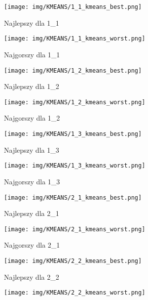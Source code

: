 \documentclass[12pt]{article}
\begin{document}
\begin{figure}[H]
    \centering
    \begin{subfigure}[b]{0.24\textwidth}
        \texttt{[image: img/KMEANS/1\_1\_kmeans\_best.png]}
        \caption{Najlepszy dla 1\_1}
    \end{subfigure}
    \hfill
    \begin{subfigure}[b]{0.24\textwidth}
        \texttt{[image: img/KMEANS/1\_1\_kmeans\_worst.png]}
        \caption{Najgorszy dla 1\_1}
    \end{subfigure}
    \hfill
    \begin{subfigure}[b]{0.24\textwidth}
        \texttt{[image: img/KMEANS/1\_2\_kmeans\_best.png]}
        \caption{Najlepszy dla 1\_2}
    \end{subfigure}
    \hfill
    \begin{subfigure}[b]{0.24\textwidth}
        \texttt{[image: img/KMEANS/1\_2\_kmeans\_worst.png]}
        \caption{Najgorszy dla 1\_2}
    \end{subfigure}
    \begin{subfigure}[b]{0.24\textwidth}
        \texttt{[image: img/KMEANS/1\_3\_kmeans\_best.png]}
        \caption{Najlepszy dla 1\_3}
    \end{subfigure}
    \hfill
    \begin{subfigure}[b]{0.24\textwidth}
        \texttt{[image: img/KMEANS/1\_3\_kmeans\_worst.png]}
        \caption{Najgorszy dla 1\_3}
    \end{subfigure}
    \hfill
    \begin{subfigure}[b]{0.24\textwidth}
        \texttt{[image: img/KMEANS/2\_1\_kmeans\_best.png]}
        \caption{Najlepszy dla 2\_1}
    \end{subfigure}
    \hfill
    \begin{subfigure}[b]{0.24\textwidth}
        \texttt{[image: img/KMEANS/2\_1\_kmeans\_worst.png]}
        \caption{Najgorszy dla 2\_1}
    \end{subfigure}
    \begin{subfigure}[b]{0.24\textwidth}
        \texttt{[image: img/KMEANS/2\_2\_kmeans\_best.png]}
        \caption{Najlepszy dla 2\_2}
    \end{subfigure}
    \hfill
    \begin{subfigure}[b]{0.24\textwidth}
        \texttt{[image: img/KMEANS/2\_2\_kmeans\_worst.png]}

\end{subfigure}
\end{figure}
\end{document}
